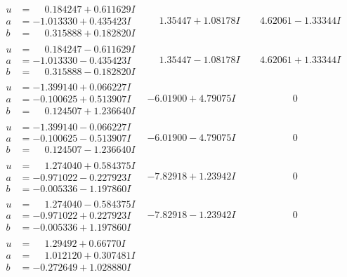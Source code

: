 \documentclass[1p]{elsarticle_modified}
\theoremstyle{definition}
\begin{document}
$$\begin{array}{c|c|c}
\begin{aligned}
u &= \phantom{-}0.184247 + 0.611629 I \\
a &= -1.013330 + 0.435423 I \\
b &= \phantom{-}0.315888 + 0.182820 I\end{aligned}
 & \phantom{-}1.35447 + 1.08178 I & \phantom{-}4.62061 - 1.33344 I \\ \hline\begin{aligned}
u &= \phantom{-}0.184247 - 0.611629 I \\
a &= -1.013330 - 0.435423 I \\
b &= \phantom{-}0.315888 - 0.182820 I\end{aligned}
 & \phantom{-}1.35447 - 1.08178 I & \phantom{-}4.62061 + 1.33344 I \\ \hline\begin{aligned}
u &= -1.399140 + 0.066227 I \\
a &= -0.100625 + 0.513907 I \\
b &= \phantom{-}0.124507 + 1.236640 I\end{aligned}
 & -6.01900 + 4.79075 I & \phantom{-0.000000 } 0 \\ \hline\begin{aligned}
u &= -1.399140 - 0.066227 I \\
a &= -0.100625 - 0.513907 I \\
b &= \phantom{-}0.124507 - 1.236640 I\end{aligned}
 & -6.01900 - 4.79075 I & \phantom{-0.000000 } 0 \\ \hline\begin{aligned}
u &= \phantom{-}1.274040 + 0.584375 I \\
a &= -0.971022 - 0.227923 I \\
b &= -0.005336 - 1.197860 I\end{aligned}
 & -7.82918 + 1.23942 I & \phantom{-0.000000 } 0 \\ \hline\begin{aligned}
u &= \phantom{-}1.274040 - 0.584375 I \\
a &= -0.971022 + 0.227923 I \\
b &= -0.005336 + 1.197860 I\end{aligned}
 & -7.82918 - 1.23942 I & \phantom{-0.000000 } 0 \\ \hline\begin{aligned}
u &= \phantom{-}1.29492 + 0.66770 I \\
a &= \phantom{-}1.012120 + 0.307481 I \\
b &= -0.272649 + 1.028880 I\end{aligned}

\end{array}$$
\end{document}
